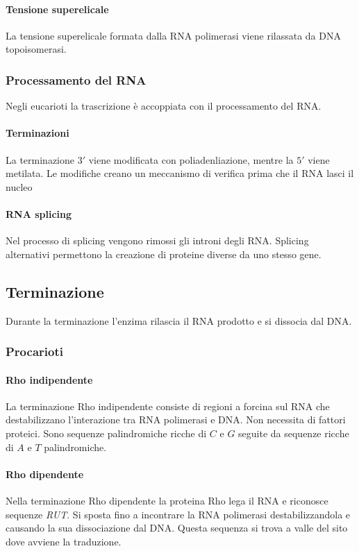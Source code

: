			\paragraph{Tensione superelicale}
			La tensione superelicale formata dalla RNA polimerasi viene rilassata da DNA topoisomerasi.

		\subsubsection{Processamento del RNA}
		Negli eucarioti la trascrizione \`e accoppiata con il processamento del RNA.

			\paragraph{Terminazioni}
			La terminazione $3'$ viene modificata con poliadenliazione, mentre la $5'$ viene metilata.
			Le modifiche creano un meccanismo di verifica prima che il RNA lasci il nucleo

			\paragraph{RNA splicing}
			Nel processo di splicing vengono rimossi gli introni degli RNA.
			Splicing alternativi permettono la creazione di proteine diverse da uno stesso gene.

	\subsection{Terminazione}
	Durante la terminazione l'enzima rilascia il RNA prodotto e si dissocia dal DNA.

		\subsubsection{Procarioti}

			\paragraph{Rho indipendente}
			La terminazione Rho indipendente consiste di regioni a forcina sul RNA che destabilizzano l'interazione tra RNA polimerasi e DNA.
			Non necessita di fattori proteici.
			Sono sequenze palindromiche ricche di $C$ e $G$ seguite da sequenze ricche di $A$ e $T$ palindromiche.

			\paragraph{Rho dipendente}
			Nella terminazione Rho dipendente la proteina Rho lega il RNA e riconosce sequenze \emph{RUT}.
			Si sposta fino a incontrare la RNA polimerasi destabilizzandola e causando la sua dissociazione dal DNA.
			Questa sequenza si trova a valle del sito dove avviene la traduzione.


